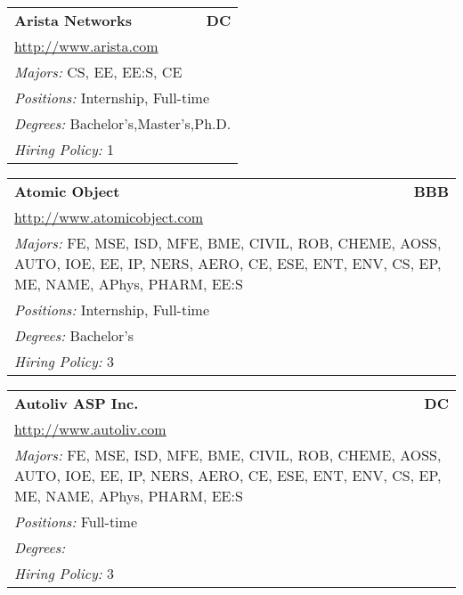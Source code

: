 \documentclass[twoside]{article}
\begin{document}
\begin{center}
\begin{multicols}{3}
\begin{FlushLeft}
\begin{minipage}{.9\columnwidth}\begin{tabularx}{.95\columnwidth}{Xr}
                 {\Large\bf Arista Networks} & {\Large\bf DC}\\
    \multicolumn{2}{p{.95\columnwidth}}{\url{http://www.arista.com}}\\
    \multicolumn{2}{p{.95\columnwidth}}{\emph{Majors:} CS, EE, EE:S, CE}\\
    \multicolumn{2}{p{.95\columnwidth}}{\emph{Positions:} Internship, Full-time}\\
    \multicolumn{2}{p{.95\columnwidth}}{\emph{Degrees:} Bachelor's,Master's,Ph.D.}\\
    \multicolumn{2}{p{.95\columnwidth}}{\emph{Hiring Policy:} 1}\\
    \end{tabularx}
    
\end{minipage}
 
\begin{minipage}{.9\columnwidth}\begin{tabularx}{.95\columnwidth}{Xr}
                 {\Large\bf Atomic Object} & {\Large\bf BBB}\\
    \multicolumn{2}{p{.95\columnwidth}}{\url{http://www.atomicobject.com}}\\
    \multicolumn{2}{p{.95\columnwidth}}{\emph{Majors:} FE, MSE, ISD, MFE, BME, CIVIL, ROB, CHEME, AOSS, AUTO, IOE, EE, IP, NERS, AERO, CE, ESE, ENT, ENV, CS, EP, ME, NAME, APhys, PHARM, EE:S}\\
    \multicolumn{2}{p{.95\columnwidth}}{\emph{Positions:} Internship, Full-time}\\
    \multicolumn{2}{p{.95\columnwidth}}{\emph{Degrees:} Bachelor's}\\
    \multicolumn{2}{p{.95\columnwidth}}{\emph{Hiring Policy:} 3}\\
    \end{tabularx}
    
\end{minipage}
 
\begin{minipage}{.9\columnwidth}\begin{tabularx}{.95\columnwidth}{Xr}
                 {\Large\bf Autoliv ASP Inc.} & {\Large\bf DC}\\
    \multicolumn{2}{p{.95\columnwidth}}{\url{http://www.autoliv.com}}\\
    \multicolumn{2}{p{.95\columnwidth}}{\emph{Majors:} FE, MSE, ISD, MFE, BME, CIVIL, ROB, CHEME, AOSS, AUTO, IOE, EE, IP, NERS, AERO, CE, ESE, ENT, ENV, CS, EP, ME, NAME, APhys, PHARM, EE:S}\\
    \multicolumn{2}{p{.95\columnwidth}}{\emph{Positions:} Full-time}\\
    \multicolumn{2}{p{.95\columnwidth}}{\emph{Degrees:} }\\
    \multicolumn{2}{p{.95\columnwidth}}{\emph{Hiring Policy:} 3}\\
    \end{tabularx}
    

\end{minipage}
\end{FlushLeft}
\end{multicols}
\end{center}
\end{document}
